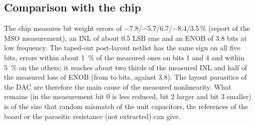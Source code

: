 \begin{table}[H]\centering\scriptsize

\caption{Wiring capacitance of the plates of the taped-out layout per unit capacitor (\si{fF}), split
by the net on the other side (\texttt{sim/pex/dacpar.py}). VSH is the switched plate of a bit (to the
input, VOUTH or VOUTL), FL the floating plate. VOUTH and VOUTL are the two comparator inputs (top
plates); H is the lower half, whose MSB connects to VOUTH, L the upper half (MSB on VOUTL, the other bits
with VOUTH and VOUTL exchanged). ``VSH--FL'' is the wiring coupling between the two plates of the same bit, in parallel with the
unit capacitors.}
\label{tab:par_tapeout}
\end{table}

\subsection{Comparison with the chip}
The chip measures bit weight errors of \num{-7.8}/\num{-5.7}/\num{+6.7}/\num{-8.4}/\num{+3.5}\,\%
(report of the MSO measurement), an INL of about \num{0.5} LSB rms and an ENOB of \num{3.8} bits at low
frequency. The taped-out post-layout netlist has the same sign on all five bits, errors within about
\SI{1}{\percent} of the measured ones on bits 1 and 4 and within \SI{5}{\percent} on the others; it reaches about two thirds of the measured INL and half of the measured
loss of ENOB (from \SchStEnob{} to \TpStEnob{} bits, against \num{3.8}). The layout parasitics of the
DAC are therefore the main cause of the measured nonlinearity. What remains (in the measurement bit 0 is less
reduced, bit 2 larger and bit 3 smaller) is of the size that random mismatch of the unit capacitors, the
references of the board or the parasitic resistance (not extracted) can give.

